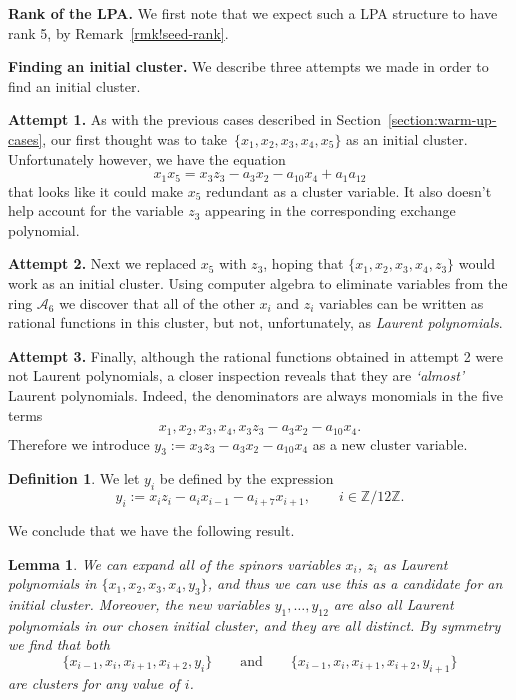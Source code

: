\documentclass[10pt,a4paper]{amsart}
\numberwithin{equation}{section}
\newtheorem{lem}[thm]{Lemma}
\theoremstyle{definition}
\newtheorem{defn}[thm]{Definition}
\newcommand{\ZZ}{\mathbb{Z}}
\begin{document}
{\bf Rank of the LPA.}
We first note that we expect such a LPA structure to have rank 5, by Remark~\ref{rmk!seed-rank}.

{\bf Finding an initial cluster.}
We describe three attempts we made in order to find an initial cluster.

{\bf Attempt 1.}
As with the previous cases described in Section~\ref{section:warm-up-cases}, our first thought was to take~${\{x_1,x_2,x_3,x_4,x_5\}}$ as an initial cluster. Unfortunately however, we have the equation
\[x_1x_5 = x_3z_3 - a_3x_2 - a_{10}x_4 + a_1a_{12} \]
that looks like it could make $x_5$ redundant as a cluster variable. It also doesn't help account for the variable $z_3$ appearing in the corresponding exchange polynomial.

{\bf Attempt 2.}
Next we replaced $x_5$ with $z_3$, hoping that $\{x_1,x_2,x_3,x_4,z_3\}$ would work as an initial cluster. Using computer algebra to eliminate variables from the ring $\mathcal A_6$ we discover that all of the other $x_i$ and $z_i$ variables can be written as rational functions in this cluster, but not, unfortunately, as \emph{Laurent polynomials}.

{\bf Attempt 3.}
Finally, although the rational functions obtained in attempt 2 were not Laurent polynomials, a closer inspection reveals that they are \emph{`almost'} Laurent polynomials. Indeed, the denominators are always monomials in the five terms
\[ x_1, x_2, x_3, x_4, x_3z_3 - a_3x_2 - a_{10}x_4. \]
Therefore we introduce $y_3:=x_3z_3 - a_3x_2 - a_{10}x_4$ as a new cluster variable.

\begin{defn}
We let $y_i$ be defined by the expression
\[ y_i := x_iz_i-a_ix_{i-1}-a_{i+7}x_{i+1}, \qquad i\in \ZZ/12\ZZ. \]
\end{defn}

We conclude that we have the following result.

\begin{lem}
We can expand all of the spinors variables $x_i$, $z_i$ as Laurent polynomials in $\{x_1,x_2,x_3,x_4,y_3\}$, and thus we can use this as a candidate for an initial cluster. Moreover, the new variables $y_1,\ldots,y_{12}$ are also all Laurent polynomials in our chosen initial cluster, and they are all distinct. By symmetry we find that both
\[ \{ x_{i-1},x_i,x_{i+1},x_{i+2}, y_i \} \qquad \text{and} \qquad \{ x_{i-1},x_i,x_{i+1},x_{i+2}, y_{i+1} \} \]
are clusters for any value of $i$.
\end{lem}
\end{document}
